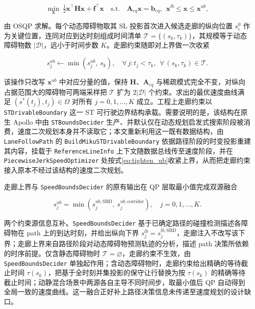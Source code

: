 \documentclass[a4paper,11pt]{ctexart}
\theoremstyle{definition}
\begin{document}
\begin{equation}
    \min_{\mathbf{x}}\ \tfrac{1}{2}\mathbf{x}^{\top}\mathbf{H}\mathbf{x} + \mathbf{f}^{\top}\mathbf{x}
    \quad \text{s.t.}\quad \mathbf{A}_{eq}\mathbf{x} = \mathbf{b}_{eq},\ \ \mathbf{x}^{lb} \leq \mathbf{x} \leq \mathbf{x}^{ub},
    \label{eq:qp_compact}
\end{equation}

由 OSQP 求解。每个动态障碍物取其 SL 投影首次进入候选走廊的纵向位置 $s_i^{0}$ 作为关键位置，连同对应到达时刻组成时间清单 $\mathcal{T} = \{(s_k, \tau_k)\}$，其规模等于动态障碍物数 $|\mathcal{D}|$，远小于时间步数 $K$。走廊约束随即对上界做一次收紧

\begin{equation}
    s_j^{ub} \leftarrow \min\!\left(s_j^{ub},\ s_k\right), \quad \forall\, j: t_j < \tau_k,\ \ \forall\, (s_k, \tau_k) \in \mathcal{T}.
    \label{eq:tighten_ub}
\end{equation}

该操作只改写 $\mathbf{x}^{ub}$ 中对应分量的值，保持 $\mathbf{H}$、$\mathbf{A}_{eq}$ 与稀疏模式完全不变，对纵向占据范围大的障碍物可两端采样把 $\mathcal{T}$ 扩为 $2|\mathcal{D}|$ 个约束。求出的最优速度曲线满足 $(s^{*}(t_j), t_j) \in \Omega$ 对所有 $j=0,1,\ldots,K$ 成立。工程上走廊约束以 \texttt{STDrivableBoundary} 这一 ST 可行驶边界结构承载。需要说明的是，该结构在原生 Apollo 中由 \texttt{STBoundsDecider} 生产、并默认仅在动态规划启发式搜索阶段被消费，速度二次规划本身并不读取它；本文重新利用这一既有数据结构，由 \texttt{LaneFollowPath} 的 \texttt{BuildMikuSTDrivableBoundary} 依据路径阶段的时变投影重建其内容，挂载于 \texttt{ReferenceLineInfo} 上下文随数据总线传至速度阶段，并在 \texttt{PiecewiseJerkSpeedOptimizer} 处按式\eqref{eq:tighten_ub}收紧上界，从而把走廊约束接入原本不经过该结构的速度二次规划。

走廊上界与 \texttt{SpeedBoundsDecider} 的原有输出在 QP 层取最小值完成双源融合

\begin{equation}
    s_j^{ub} = \min\!\left(s_j^{ub,\mathrm{SBD}},\ s_j^{ub,\mathrm{corridor}}\right), \quad j = 0,1,\ldots,K.
    \label{eq:dual_source}
\end{equation}

两个约束源信息互补。\texttt{SpeedBoundsDecider} 基于已确定路径的碰撞检测描述各障碍物在 path 上的到达时刻，并给出纵向下界 $s_j^{lb}=s_j^{lb,\mathrm{SBD}}$，走廊注入不改写该下界；走廊上界来自路径阶段对动态障碍物预测轨迹的分析，描述 path 决策所依赖的时序前提。仅含静态障碍物时 $\mathcal{T}=\varnothing$，走廊约束不生效，由 \texttt{SpeedBoundsDecider} 单独起作用；含动态障碍物时，走廊约束给出精确的等待截止时间 $\tau(s_k)$，把基于全时刻并集投影的保守让行替换为按 $\tau(s_k)$ 的精确等待截止时间；动静混合场景中两源各自主导不同时间步，取最小值后 QP 自动得到全局一致的速度曲线。这一融合正好补上路径决策信息未传递至速度规划的设计缺口。
\end{document}
